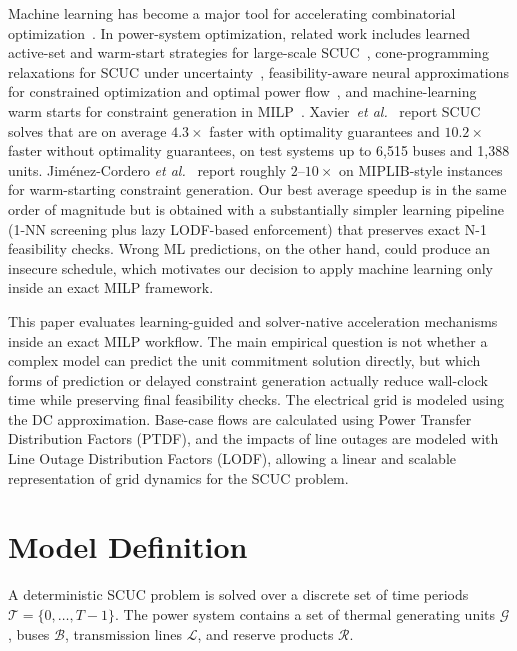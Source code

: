 \documentclass[runningheads]{llncs}
\begin{document}
Machine learning has become a major tool for accelerating combinatorial optimization~\cite{Bengio2021}. In power-system optimization, related work includes learned active-set and warm-start strategies for large-scale SCUC~\cite{Xavier2019}, cone-programming relaxations for SCUC under uncertainty~\cite{Quarm2021}, feasibility-aware neural approximations for constrained optimization and optimal power flow~\cite{Donti2021}, and machine-learning warm starts for constraint generation in MILP~\cite{JimenezCordero2022}. Xavier~\textit{et al.}~\cite{Xavier2019} report SCUC solves that are on average $4.3\times$ faster with optimality guarantees and $10.2\times$ faster without optimality guarantees, on test systems up to 6{,}515 buses and 1{,}388 units. Jim{\'e}nez-Cordero \textit{et al.}~\cite{JimenezCordero2022} report roughly $2$--$10\times$ on MIPLIB-style instances for warm-starting constraint generation. Our best average speedup is in the same order of magnitude but is obtained with a substantially simpler learning pipeline (1-NN screening plus lazy LODF-based enforcement) that preserves exact N-1 feasibility checks. Wrong ML predictions, on the other hand, could produce an insecure schedule, which motivates our decision to apply machine learning only inside an exact MILP framework.

This paper evaluates learning-guided and solver-native acceleration mechanisms inside an exact MILP workflow. The main empirical question is not whether a complex model can predict the unit commitment solution directly, but which forms of prediction or delayed constraint generation actually reduce wall-clock time while preserving final feasibility checks. The electrical grid is modeled using the DC approximation. Base-case flows are calculated using Power Transfer Distribution Factors (PTDF), and the impacts of line outages are modeled with Line Outage Distribution Factors (LODF), allowing a linear and scalable representation of grid dynamics for the SCUC problem.

\section{Model Definition}

A deterministic SCUC problem is solved over a discrete set of time periods $\mathcal{T}=\{0,\dots,T-1\}$. The power system contains a set of thermal generating units $\mathcal{G}$, buses $\mathcal{B}$, transmission lines $\mathcal{L}$, and reserve products $\mathcal{R}$.
\end{document}
